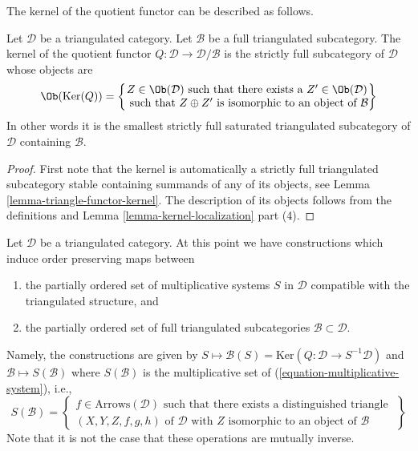 \noindent
The kernel of the quotient functor can be described as follows.

\begin{lemma}
\label{lemma-kernel-quotient}
Let $\mathcal{D}$ be a triangulated category.
Let $\mathcal{B}$ be a full triangulated subcategory.
The kernel of the quotient functor
$Q : \mathcal{D} \to \mathcal{D}/\mathcal{B}$
is the strictly full subcategory of $\mathcal{D}$ whose objects are
$$
\Ob(\text{Ker}(Q)) =
\left\{
\begin{matrix}
Z \in \Ob(\mathcal{D})
\text{ such that there exists a }Z' \in \Ob(\mathcal{D}) \\
\text{ such that }Z \oplus Z'\text{ is isomorphic to an object of }\mathcal{B}
\end{matrix}
\right\}
$$
In other words it is the smallest strictly full saturated triangulated
subcategory of $\mathcal{D}$ containing $\mathcal{B}$.
\end{lemma}

\begin{proof}
First note that the kernel is automatically a strictly full
triangulated subcategory stable containing summands of any of its objects, see
Lemma \ref{lemma-triangle-functor-kernel}.
The description of its objects follows from the definitions and
Lemma \ref{lemma-kernel-localization} part (4).
\end{proof}

\noindent
Let $\mathcal{D}$ be a triangulated category.
At this point we have constructions which induce order
preserving maps between
\begin{enumerate}
\item the partially ordered set of multiplicative systems $S$ in $\mathcal{D}$
compatible with the triangulated structure, and
\item the partially ordered set of full triangulated subcategories
$\mathcal{B} \subset \mathcal{D}$.
\end{enumerate}
Namely, the constructions are given by
$S \mapsto \mathcal{B}(S) = \text{Ker}(Q : \mathcal{D} \to S^{-1}\mathcal{D})$
and $\mathcal{B} \mapsto S(\mathcal{B})$
where $S(\mathcal{B})$ is the multiplicative set of
(\ref{equation-multiplicative-system}), i.e.,
$$
S(\mathcal{B}) =
\left\{
\begin{matrix}
f \in \text{Arrows}(\mathcal{D})
\text{ such that there exists a distinguished triangle }\\
(X, Y, Z, f, g, h) \text{ of }\mathcal{D}\text{ with }
Z\text{ isomorphic to an object of }\mathcal{B}
\end{matrix}
\right\}
$$
Note that it is not the case that these operations are mutually inverse.

